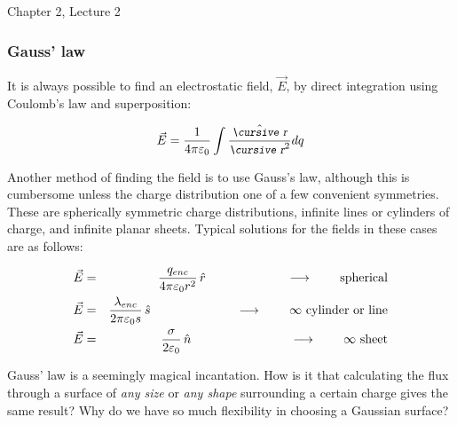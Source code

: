 \documentclass[12pt]{article}
\begin{document}
\begin{flushright} {\color{blue} Chapter 2, Lecture 2} \end{flushright}
\begin{flushleft}

\subsubsection*{\bf Gauss' law}


It is always possible to find an electrostatic field, $\vec{E}$, by direct integration using Coulomb's law and superposition:

\begin{equation}
\vec{E}=\frac{1}{4\pi \varepsilon_{0}} \int \frac{ \hat{\text{\small\slshape\cursive r}} }{\text{\small\slshape\cursive r}^{2}} dq
\label{eq:intcoul}
\end{equation}

Another method of finding the field is to use Gauss's law, although this is cumbersome unless the charge distribution one of a few convenient symmetries.  These are spherically symmetric charge distributions, infinite lines or cylinders of charge, and infinite planar sheets.  Typical solutions for the fields in these cases are as follows:

\begin{eqnarray*}
 \vec{E}  & = & \frac{ q_{enc} }{ 4 \pi \varepsilon_{0} r^{2}} \, \hat{r} \hspace{.9in} \longrightarrow \hspace{.3in} \mbox{spherical} \\
\vec{E}  & = & \frac{ \lambda_{enc} }{ 2 \pi \varepsilon_{0} s} \, \hat{s} \hspace{.95in} \longrightarrow \hspace{.3in} \mbox{$\infty$ cylinder or line} \\
 \vec{E}  & = & \frac{ \sigma}{ 2 \varepsilon_{0} } \, \hat{n} \hspace{1.1in} \longrightarrow \hspace{.3in} \mbox{$\infty$ sheet} \\
\end{eqnarray*}

Gauss' law is a seemingly magical incantation.  How is it that calculating the flux through a surface of {\it any size} or {\it any shape} surrounding a certain charge gives the same result?  Why do we have so much flexibility in choosing a Gaussian surface?


\end{flushleft}
\end{document}

